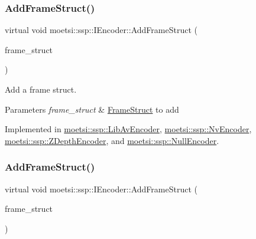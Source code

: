 \subsubsection{\texorpdfstring{Add\+Frame\+Struct()}{AddFrameStruct()}\hspace{0.1cm}{\footnotesize\ttfamily [1/2]}}
{\footnotesize\ttfamily virtual void moetsi\+::ssp\+::\+I\+Encoder\+::\+Add\+Frame\+Struct (\begin{DoxyParamCaption}\item[{std\+::shared\+\_\+ptr$<$ \hyperlink{structmoetsi_1_1ssp_1_1FrameStruct}{Frame\+Struct} $>$ \&}]{frame\+\_\+struct }\end{DoxyParamCaption})\hspace{0.3cm}{\ttfamily [pure virtual]}}



Add a frame struct. 


\begin{DoxyParams}{Parameters}
{\em frame\+\_\+struct} & \hyperlink{structmoetsi_1_1ssp_1_1FrameStruct}{Frame\+Struct} to add \\
\hline
\end{DoxyParams}


Implemented in \hyperlink{classmoetsi_1_1ssp_1_1LibAvEncoder_a931327f154e0da63fdfed73cf317d688}{moetsi\+::ssp\+::\+Lib\+Av\+Encoder}, \hyperlink{classmoetsi_1_1ssp_1_1NvEncoder_a99fbcbd5f04c5b3b395167badbf84b2f}{moetsi\+::ssp\+::\+Nv\+Encoder}, \hyperlink{classmoetsi_1_1ssp_1_1ZDepthEncoder_a382e94eab7789cb4437b9711e5292343}{moetsi\+::ssp\+::\+Z\+Depth\+Encoder}, and \hyperlink{classmoetsi_1_1ssp_1_1NullEncoder_a05f90c640c372d00f45173ec3e9436be}{moetsi\+::ssp\+::\+Null\+Encoder}.

\mbox{\label{classmoetsi_1_1ssp_1_1IEncoder_a8c223ec82fdd30ee8ee75157306054ec}} 
\subsubsection{\texorpdfstring{Add\+Frame\+Struct()}{AddFrameStruct()}\hspace{0.1cm}{\footnotesize\ttfamily [2/2]}}
{\footnotesize\ttfamily virtual void moetsi\+::ssp\+::\+I\+Encoder\+::\+Add\+Frame\+Struct (\begin{DoxyParamCaption}\item[{std\+::shared\+\_\+ptr$<$ \hyperlink{structmoetsi_1_1ssp_1_1FrameStruct}{Frame\+Struct} $>$ \&}]{frame\+\_\+struct }\end{DoxyParamCaption})\hspace{0.3cm}{\ttfamily [pure virtual]}}



